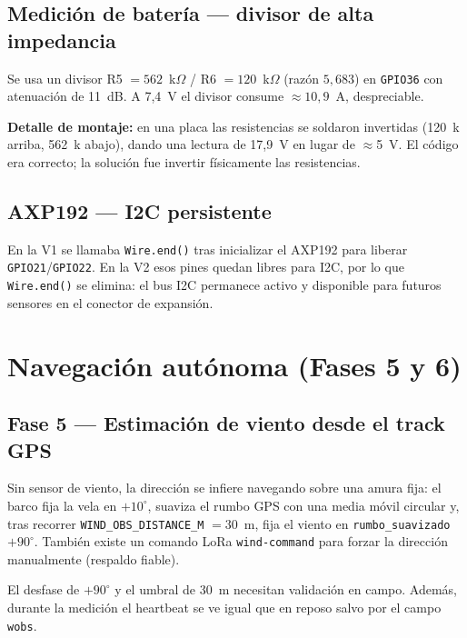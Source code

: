 \documentclass[12pt,a4paper]{article}
\newcommand{\gpio}[1]{\texttt{GPIO#1}}
\begin{document}
\subsection{Medici\'on de bater\'ia --- divisor de alta impedancia}

Se usa un divisor R5 $=562$~k$\Omega$ / R6 $=120$~k$\Omega$ (raz\'on $5{,}683$) en
\gpio{36} con atenuaci\'on de 11~dB. A 7,4~V el divisor consume
$\approx10{,}9$~\textmu A, despreciable.

\begin{warningbox}
  \textbf{Detalle de montaje:} en una placa las resistencias se soldaron
  invertidas (120~k arriba, 562~k abajo), dando una lectura de 17,9~V en lugar de
  $\approx$5~V. El c\'odigo era correcto; la soluci\'on fue invertir f\'isicamente
  las resistencias.
\end{warningbox}

\subsection{AXP192 --- I2C persistente}

En la V1 se llamaba \texttt{Wire.end()} tras inicializar el AXP192 para liberar
\gpio{21}/\gpio{22}. En la V2 esos pines quedan libres para I2C, por lo que
\texttt{Wire.end()} se elimina: el bus I2C permanece activo y disponible para
futuros sensores en el conector de expansi\'on.

\section{Navegaci\'on aut\'onoma (Fases 5 y 6)}

\subsection{Fase 5 --- Estimaci\'on de viento desde el track GPS}

Sin sensor de viento, la direcci\'on se infiere navegando sobre una amura fija:
el barco fija la vela en $+10^{\circ}$, suaviza el rumbo GPS con una media m\'ovil
circular y, tras recorrer \texttt{WIND\_OBS\_DISTANCE\_M} $=30$~m, fija el viento
en \texttt{rumbo\_suavizado $+ 90^{\circ}$}. Tambi\'en existe un comando LoRa
\texttt{wind-command} para forzar la direcci\'on manualmente (respaldo fiable).

\begin{warningbox}
  El desfase de $+90^{\circ}$ y el umbral de 30~m necesitan validaci\'on en campo.
  Adem\'as, durante la medici\'on el heartbeat se ve igual que en reposo salvo por
  el campo \texttt{wobs}.
\end{warningbox}
\end{document}

